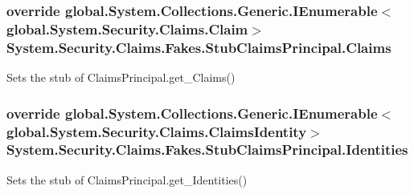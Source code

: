 \hypertarget{class_system_1_1_security_1_1_claims_1_1_fakes_1_1_stub_claims_principal_add2ac3a8268d0a3eabfa120470dd5377}{
\subsubsection[{Claims}]{\setlength{\rightskip}{0pt plus 5cm}override global.\-System.\-Collections.\-Generic.\-I\-Enumerable$<$global.\-System.\-Security.\-Claims.\-Claim$>$ System.\-Security.\-Claims.\-Fakes.\-Stub\-Claims\-Principal.\-Claims\hspace{0.3cm}{\ttfamily [get]}}}\label{class_system_1_1_security_1_1_claims_1_1_fakes_1_1_stub_claims_principal_add2ac3a8268d0a3eabfa120470dd5377}


Sets the stub of Claims\-Principal.\-get\-\_\-\-Claims()

\hypertarget{class_system_1_1_security_1_1_claims_1_1_fakes_1_1_stub_claims_principal_aeb24f4e5c6f0bd1f03517ad36aaf6d4b}{
\subsubsection[{Identities}]{\setlength{\rightskip}{0pt plus 5cm}override global.\-System.\-Collections.\-Generic.\-I\-Enumerable$<$global.\-System.\-Security.\-Claims.\-Claims\-Identity$>$ System.\-Security.\-Claims.\-Fakes.\-Stub\-Claims\-Principal.\-Identities\hspace{0.3cm}{\ttfamily [get]}}}\label{class_system_1_1_security_1_1_claims_1_1_fakes_1_1_stub_claims_principal_aeb24f4e5c6f0bd1f03517ad36aaf6d4b}


Sets the stub of Claims\-Principal.\-get\-\_\-\-Identities()

